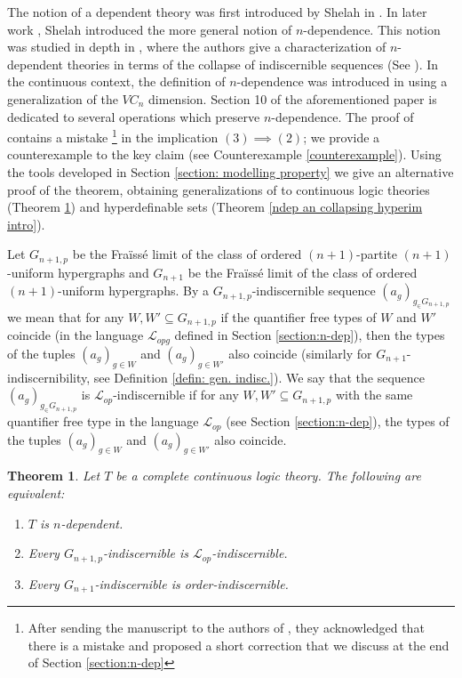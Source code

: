 \documentclass{amsart}
\newtheorem{teor}{Theorem}[section]
\newtheorem{external claim}[teor]{Claim}
\newcommand{\mL}{\mathcal{L}}
\begin{document}
The notion of a dependent theory was first introduced by Shelah in \cite{Shelah1982-SHECTA-5}. 
In later work \cite{Shelah2005StronglyDT, Shelah2007DefinableGF}, Shelah introduced the more general notion of $n$-dependence. This notion was studied in depth in \cite{Chernikov2014OnN}, where the authors give a characterization of $n$-dependent theories in terms of the collapse of indiscernible sequences (See \cite[Theorem 5.4]{Chernikov2014OnN}). In the continuous context, the definition of $n$-dependence was introduced in \cite{Chernikov2020HypergraphRA} using a generalization of the $VC_n$ dimension. Section 10 of the aforementioned paper is dedicated to several operations which preserve $n$-dependence.  The proof of \cite[Theorem 5.4]{Chernikov2014OnN} contains a mistake \footnote{After sending the manuscript to the authors of \cite{Chernikov2014OnN}, they acknowledged that there is a mistake and proposed a short correction that we discuss at the end of Section \ref{section:n-dep}} in the implication $(3)\implies (2)$; we provide a counterexample to the key claim (see Counterexample \ref{counterexample}). Using  the tools developed in Section \ref{section: modelling property} we give an alternative proof of the theorem, obtaining generalizations of \cite[Theorem 5.4]{Chernikov2014OnN} to continuous logic theories (Theorem \ref{n-dep and collapsing intro}) and hyperdefinable sets (Theorem \ref{ndep an collapsing hyperim intro}).

Let $G_{n+1,p}$ be the Fraïssé limit of the class of ordered $(n+1)$-partite $(n+1)$-uniform hypergraphs and $G_{n+1}$ be the Fraïssé limit of the class of ordered $(n+1)$-uniform hypergraphs. By a $G_{n+1,p}$-indiscernible sequence $(a_g)_{g_\in G_{n+1,p}}$ we mean that for any $W,W'\subseteq G_{n+1,p}$ if the quantifier free types of $W$ and $W'$ coincide (in the language $\mL_{opg}$ defined in Section \ref{section:n-dep}), then the types of the tuples $(a_g)_{g\in W}$ and $(a_g)_{g\in W'}$ also coincide (similarly for $G_{n+1}$-indiscernibility, see Definition \ref{defin: gen. indisc.}). We say that the sequence $(a_g)_{g_\in G_{n+1,p}}$ is $\mL_{op}$-indiscernible if for any $W,W'\subseteq G_{n+1,p}$ with the same quantifier free type in the language $\mL_{op}$ (see Section \ref{section:n-dep}), the types of the tuples $(a_g)_{g\in W}$ and $(a_g)_{g\in W'}$ also coincide. 
\begin{teor} \label{n-dep and collapsing intro}
    Let $T$ be a complete continuous logic theory. The following are equivalent:
    \begin{enumerate}
        \item $T$ is $n$-dependent.
        \item Every $G_{n+1,p}$-indiscernible is $\mL_{op}$-indiscernible.
        \item Every $G_{n+1}$-indiscernible is order-indiscernible.
    \end{enumerate}
\end{teor}
  
\end{document}

